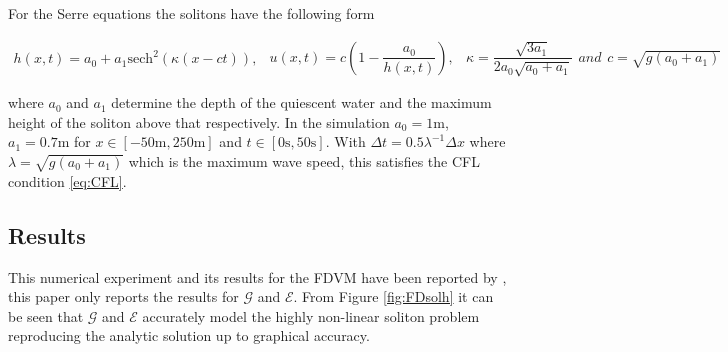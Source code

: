\documentclass[SingleSpace,12pt,Proceedings]{Serre_ASCE}
\begin{document}
For the Serre equations the solitons have the following form
\begin{linenomath*}
\begin{subequations}
\begin{gather}
h\left(x,t\right) = a_0 + a_1\text{sech}^2\left( \kappa\left(x - ct\right)\right),
\end{gather}
\begin{gather}
u\left(x,t\right) = c\left(1 - \dfrac{a_0}{h(x,t)} \right),
\end{gather}
\begin{gather}
\kappa = \dfrac{\sqrt{3a_1}}{2a_0 \sqrt{ a_0 + a_1}}
\end{gather}
and
\begin{gather}
c = \sqrt{g \left(a_0 + a_1\right)}
\end{gather}
\end{subequations}
\label{eq:sol}
\end{linenomath*}
where $a_0$ and $a_1$ determine the depth of the quiescent water and the maximum height of the soliton above that respectively. In the simulation $a_0 = 1\text{m}$, $a_1 = 0.7\text{m}$ for $x\in\left[-50\text{m},250\text{m}\right]$ and $t\in\left[0\text{s},50\text{s}\right]$. With $\Delta t = 0.5 \lambda^{-1} \Delta x$ where $\lambda = \sqrt{g \left(a_0 + a_1\right)}$ which is the maximum wave speed, this satisfies the CFL condition \eqref{eq:CFL}. 

\subsection{Results}
This numerical experiment and its results for the FDVM have been reported by , this paper only reports the results for $\mathcal{G}$ and $\mathcal{E}$. From Figure \ref{fig:FDsolh} it can be seen that $\mathcal{G}$ and $\mathcal{E}$ accurately model the highly non-linear soliton problem reproducing the analytic solution up to graphical accuracy.
\end{document}
